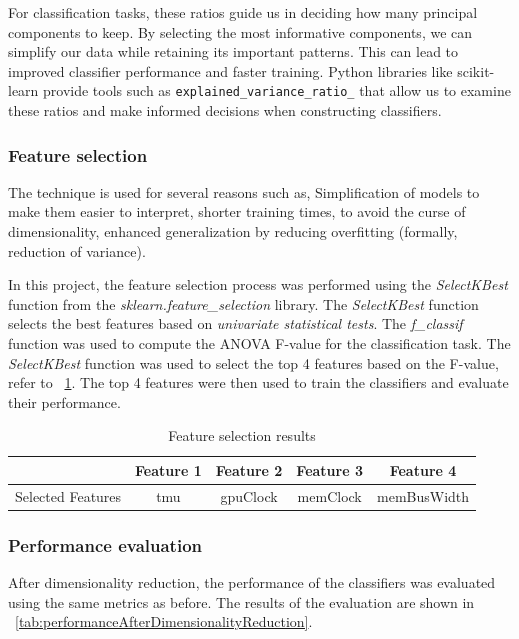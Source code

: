 \documentclass[conference,onecolumn]{IEEEtran}
\begin{document}
            For classification tasks, these ratios guide us in deciding how many principal components to keep. By selecting the most informative components, we can simplify our data while retaining its important patterns. This can lead to improved classifier performance and faster training. Python libraries like scikit-learn provide tools such as \texttt{explained\_variance\_ratio\_} that allow us to examine these ratios and make informed decisions when constructing classifiers.


        \subsubsection{Feature selection}
            The technique is used for several reasons such as, Simplification of models to make them easier to interpret, shorter training times, to avoid the curse of dimensionality, enhanced generalization by reducing overfitting (formally, reduction of variance)\cite{hinton2006reducing}.

            In this project, the feature selection process was performed using the \emph{SelectKBest} function from the \emph{sklearn.feature\_selection} library. The \emph{SelectKBest} function selects the best features based on \emph{univariate statistical tests}. The \emph{f\_classif} function was used to compute the ANOVA F-value for the classification task. The \emph{SelectKBest} function was used to select the top 4 features based on the F-value, refer to \tablename~\ref{tab:featureSelectionResults}. The top 4 features were then used to train the classifiers and evaluate their performance. 
            
            \begin{table}[H]
                \centering
                \begin{tabular}{|c|c|c|c|c|}
                    \hline
                    &   Feature 1 &   Feature 2 &   Feature 3 &   Feature 4 \\  \hline
                    \hline
                    Selected Features 	&tmu	& gpuClock	& memClock	& memBusWidth   \\
                    \hline
                \end{tabular}
                \caption{Feature selection results}
                \label{tab:featureSelectionResults}
            \end{table}

        \subsubsection{Performance evaluation}
        After dimensionality reduction, the performance of the classifiers was evaluated using the same metrics as before. The results of the evaluation are shown in \tablename~\ref{tab:performanceAfterDimensionalityReduction}. 
\end{document}
